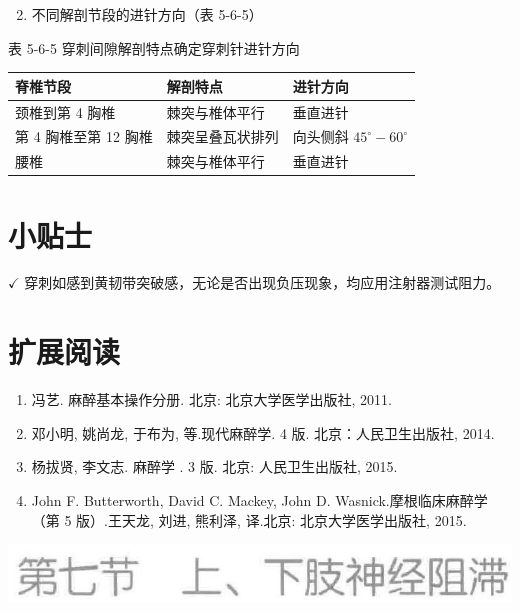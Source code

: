 \documentclass[10pt]{article}
\begin{document}
\begin{enumerate}
  \setcounter{enumi}{1}
  \item 不同解剖节段的进针方向（表 5-6-5）
\end{enumerate}

表 5-6-5 穿刺间隙解剖特点确定穿刺针进针方向

\begin{center}
\begin{tabular}{lll}
\hline
脊椎节段 & 解剖特点 & 进针方向 \\
\hline
颈椎到第 4 胸椎 & 棘突与椎体平行 & 垂直进针 \\
第 4 胸椎至第 12 胸椎 & 棘突呈叠瓦状排列 & 向头侧斜 $45^{\circ}-60^{\circ}$ \\
腰椎 & 棘突与椎体平行 & 垂直进针 \\
\hline
\end{tabular}
\end{center}

\section*{小贴士}
$\checkmark$ 穿刺如感到黄韧带突破感，无论是否出现负压现象，均应用注射器测试阻力。

\section*{扩展阅读}
\begin{enumerate}
  \item 冯艺. 麻醉基本操作分册. 北京: 北京大学医学出版社, 2011.

  \item 邓小明, 姚尚龙, 于布为, 等.现代麻醉学. 4 版. 北京：人民卫生出版社, 2014.

  \item 杨拔贤, 李文志. 麻醉学 . 3 版. 北京: 人民卫生出版社, 2015.

  \item John F. Butterworth, David C. Mackey, John D. Wasnick.摩根临床麻醉学（第 5 版）.王天龙, 刘进, 熊利泽, 译.北京: 北京大学医学出版社, 2015.

\end{enumerate}

\begin{center}
\includegraphics[max width=\textwidth]{2024_07_05_645bb794a4d4f32ee0c8g-316}
\end{center}
\end{document}
